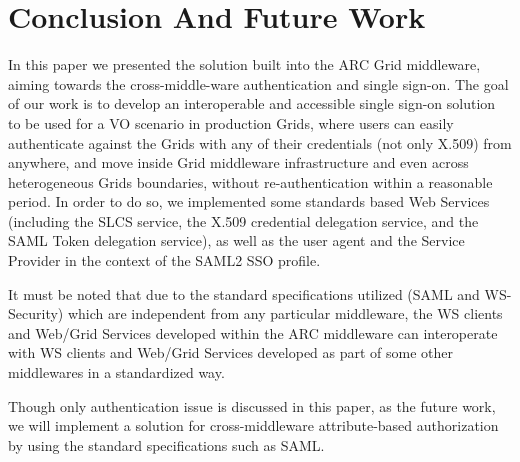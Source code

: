 \documentclass[twocolumn]{svjour3}         %
\begin{document}
\section{Conclusion And Future Work}
\label{sec:conclusion}
In this paper we presented the solution built into the ARC Grid middleware, aiming towards the cross-middle-ware authentication and single sign-on. The goal of our work is to develop an interoperable and accessible single sign-on solution to be used for a VO scenario in production Grids, where users can easily authenticate against the Grids with any of their credentials (not only X.509) from anywhere, and move inside Grid middleware infrastructure and even across heterogeneous Grids  boundaries, without re-authentication within a reasonable period. In order to do so, we implemented some standards based Web Services (including the SLCS service, the X.509 credential delegation service, and the SAML Token delegation service), as well as the user agent and the Service Provider in the context of the SAML2 SSO profile.

It must be noted that due to the standard specifications utilized (SAML and WS-Security) which are independent from any particular middleware, the WS clients and Web/Grid Services developed within the ARC middleware can interoperate with WS clients and Web/Grid Services developed as part of some other middlewares in a standardized way.

Though only authentication issue is discussed in this paper, as the future work, we will implement a solution for cross-middleware attribute-based authorization by using the standard specifications such as SAML.


\end{document}
